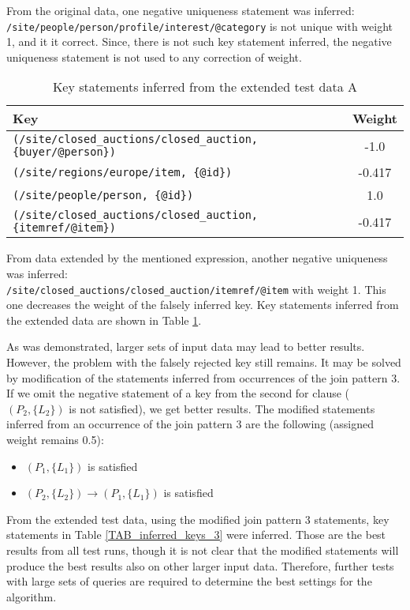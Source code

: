 From the original data, one negative uniqueness statement was inferred:\\
\texttt{/site/people/person/profile/interest/@category} is not unique with weight 1, and it it correct. Since, there is not such key statement inferred, the negative uniqueness statement is not used to any correction of weight.

\begin{table}
\begin{tabular}{|l|c|}
\hline
\textbf{Key} & \textbf{Weight} \\ \hline \hline
\texttt{(/site/closed\_auctions/closed\_auction, \{buyer/@person\})} & -1.0 \\ \hline
\texttt{(/site/regions/europe/item, \{@id\})} & -0.417 \\ \hline
\texttt{(/site/people/person, \{@id\})} & 1.0 \\ \hline
\texttt{(/site/closed\_auctions/closed\_auction, \{itemref/@item\})} & -0.417 \\ \hline
\end{tabular}
\caption{Key statements inferred from the extended test data A}
\label{TAB_inferred_keys_2}
\end{table}

From data extended by the mentioned expression, another negative uniqueness was inferred:\\
\texttt{/site/closed\_auctions/closed\_auction/itemref/@item} with weight 1. This one decreases the weight of the falsely inferred key. Key statements inferred from the extended data are shown in Table \ref{TAB_inferred_keys_2}.

As was demonstrated, larger sets of input data may lead to better results. However, the problem with the falsely rejected key still remains. It may be solved by modification of the statements inferred from occurrences of the join pattern 3. If we omit the negative statement of a key from the second for clause ($(P_2, \{L_2\})$ is not satisfied), we get better results. The modified statements inferred from an occurrence of the join pattern 3 are the following (assigned weight remains 0.5):

\begin{itemize}
\item $(P_1, \{L_1\})$ is satisfied
\item $(P_2, \{L_2\}) \rightarrow (P_1, \{L_1\})$ is satisfied
\end{itemize}

From the extended test data, using the modified join pattern 3 statements, key statements in Table \ref{TAB_inferred_keys_3} were inferred. Those are the best results from all test runs, though it is not clear that the modified statements will produce the best results also on other larger input data. Therefore, further tests with large sets of queries are required to determine the best settings for the algorithm. 

